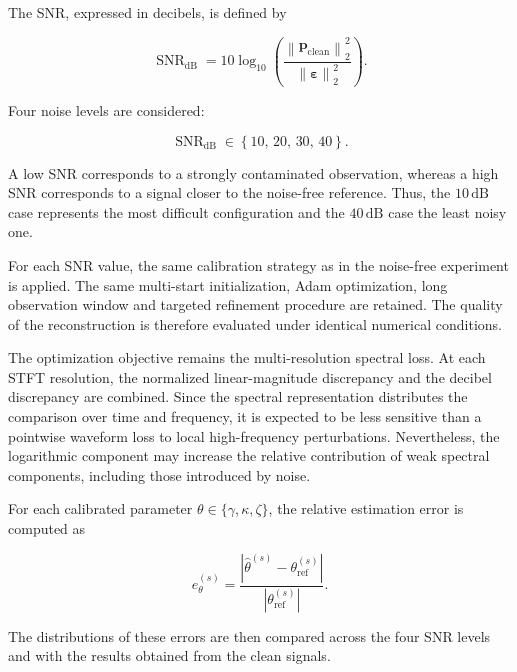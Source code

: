 \documentclass[11pt,a4paper]{report}
\theoremstyle{plain}
\theoremstyle{definition}
\begin{document}
The SNR, expressed in decibels, is defined by

\begin{equation}
\operatorname{SNR}_{\mathrm{dB}}
=
10\log_{10}
\left(
\frac{
\left\|
\mathbf{p}_{\mathrm{clean}}
\right\|_2^2
}{
\left\|
\boldsymbol{\varepsilon}
\right\|_2^2
}
\right).
\label{eq:snr_definition}
\end{equation}

Four noise levels are considered:

\begin{equation}
\operatorname{SNR}_{\mathrm{dB}}
\in
\left\{
10,\,
20,\,
30,\,
40
\right\}.
\label{eq:considered_snr}
\end{equation}

A low SNR corresponds to a strongly contaminated observation, whereas a high
SNR corresponds to a signal closer to the noise-free reference. Thus, the
\(10\,\mathrm{dB}\) case represents the most difficult configuration and the
\(40\,\mathrm{dB}\) case the least noisy one.

For each SNR value, the same calibration strategy as in the noise-free
experiment is applied. The same multi-start initialization, Adam optimization,
long observation window and targeted refinement procedure are retained. The
quality of the reconstruction is therefore evaluated under identical numerical
conditions.

The optimization objective remains the multi-resolution spectral loss. At each
STFT resolution, the normalized linear-magnitude discrepancy and the decibel
discrepancy are combined. Since the spectral representation distributes the
comparison over time and frequency, it is expected to be less sensitive than a
pointwise waveform loss to local high-frequency perturbations. Nevertheless,
the logarithmic component may increase the relative contribution of weak
spectral components, including those introduced by noise.

For each calibrated parameter
\(\theta\in\{\gamma,\kappa,\zeta\}\), the relative estimation error is computed
as

\begin{equation}
e_{\theta}^{(s)}
=
\frac{
\left|
\widehat{\theta}^{(s)}
-
\theta_{\mathrm{ref}}^{(s)}
\right|
}{
\left|
\theta_{\mathrm{ref}}^{(s)}
\right|
}.
\label{eq:noisy_relative_error}
\end{equation}

The distributions of these errors are then compared across the four SNR levels
and with the results obtained from the clean signals.
\end{document}
